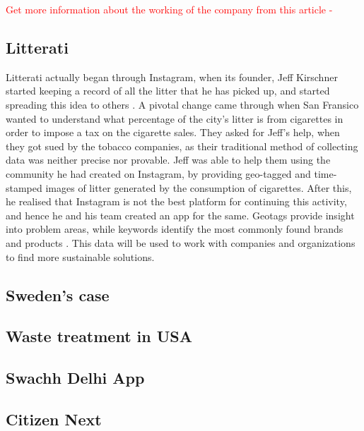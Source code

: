 \documentclass[10pt]{article}
\begin{document}
\textcolor{red}{Get more information about the working of the company from this article - \cite{Paperman:yourStory}}

\subsection{Litterati}

Litterati actually began through Instagram, when its founder, Jeff Kirschner started keeping a record of all the litter that he has picked up, and started spreading this idea to others \citep{Litterati:TED_talk}. A pivotal change came through when San Fransico wanted to understand what percentage of the city's litter is from cigarettes in order to impose a tax on the cigarette sales. They asked for Jeff's help, when they got sued by the tobacco companies, as their traditional method of collecting data was neither precise nor provable. Jeff was able to help them using the community he had created on Instagram, by providing geo-tagged and time-stamped images of litter generated by the consumption of cigarettes. After this, he realised that Instagram is not the best platform for continuing this activity, and hence he and his team created an app for the same.
Geotags provide insight into problem areas, while keywords identify the most commonly found brands and products \citep{Litterati:about}. This data will be used to work with companies and organizations to find more sustainable solutions.

\subsection{Sweden's case}

\subsection{Waste treatment in USA}

\subsection{Swachh Delhi App}

\subsection{Citizen Next}

\end{document}
